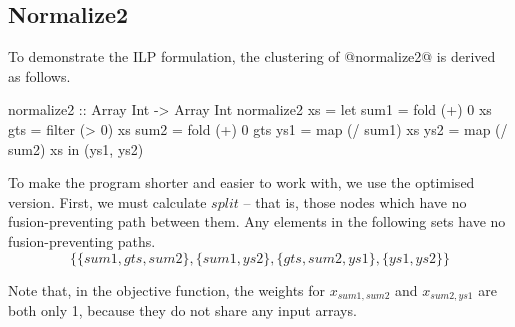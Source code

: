 \subsection{Normalize2}
To demonstrate the ILP formulation, the clustering of @normalize2@ is derived as follows.
\begin{code}
 normalize2 :: Array Int -> Array Int
 normalize2 xs
  = let sum1 = fold   (+)  0   xs
        gts  = filter (>   0)  xs
        sum2 = fold   (+)  0   gts
        ys1  = map    (/ sum1) xs
        ys2  = map    (/ sum2) xs
    in (ys1, ys2)
\end{code}

To make the program shorter and easier to work with, we use the optimised version.
First, we must calculate $split$ -- that is, those nodes which have no fusion-preventing path between them.
Any elements in the following sets have no fusion-preventing paths.
\[ \{ \{sum1, gts, sum2\}
 , \{sum1, ys2\}
 , \{gts, sum2, ys1\}
 , \{ys1, ys2\} \} \]

Note that, in the objective function, the weights for $x_{sum1, sum2}$ and $x_{sum2, ys1}$ are both only 1, because they do not share any input arrays.

